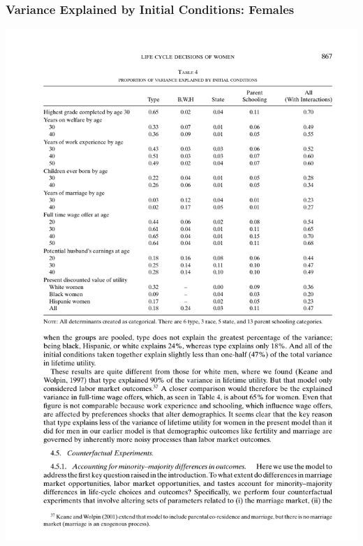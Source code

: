 \begin{frame}
	\frametitle{Variance Explained by Initial Conditions: Females}
	\includegraphics[width=\textwidth]{tab-figs/table4_2010_header} \\

\end{frame}
